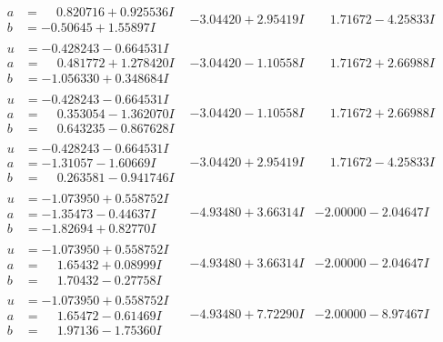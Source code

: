 \documentclass[1p]{elsarticle_modified}
\theoremstyle{definition}
\begin{document}
$$\begin{array}{c|c|c}
\begin{aligned}
a &= \phantom{-}0.820716 + 0.925536 I \\
b &= -0.50645 + 1.55897 I\end{aligned}
 & -3.04420 + 2.95419 I & \phantom{-}1.71672 - 4.25833 I \\ \hline\begin{aligned}
u &= -0.428243 - 0.664531 I \\
a &= \phantom{-}0.481772 + 1.278420 I \\
b &= -1.056330 + 0.348684 I\end{aligned}
 & -3.04420 - 1.10558 I & \phantom{-}1.71672 + 2.66988 I \\ \hline\begin{aligned}
u &= -0.428243 - 0.664531 I \\
a &= \phantom{-}0.353054 - 1.362070 I \\
b &= \phantom{-}0.643235 - 0.867628 I\end{aligned}
 & -3.04420 - 1.10558 I & \phantom{-}1.71672 + 2.66988 I \\ \hline\begin{aligned}
u &= -0.428243 - 0.664531 I \\
a &= -1.31057 - 1.60669 I \\
b &= \phantom{-}0.263581 - 0.941746 I\end{aligned}
 & -3.04420 + 2.95419 I & \phantom{-}1.71672 - 4.25833 I \\ \hline\begin{aligned}
u &= -1.073950 + 0.558752 I \\
a &= -1.35473 - 0.44637 I \\
b &= -1.82694 + 0.82770 I\end{aligned}
 & -4.93480 + 3.66314 I & -2.00000 - 2.04647 I \\ \hline\begin{aligned}
u &= -1.073950 + 0.558752 I \\
a &= \phantom{-}1.65432 + 0.08999 I \\
b &= \phantom{-}1.70432 - 0.27758 I\end{aligned}
 & -4.93480 + 3.66314 I & -2.00000 - 2.04647 I \\ \hline\begin{aligned}
u &= -1.073950 + 0.558752 I \\
a &= \phantom{-}1.65472 - 0.61469 I \\
b &= \phantom{-}1.97136 - 1.75360 I\end{aligned}
 & -4.93480 + 7.72290 I & -2.00000 - 8.97467 I \\ \hline\begin{aligned}

\end{aligned}
\end{array}$$
\end{document}
